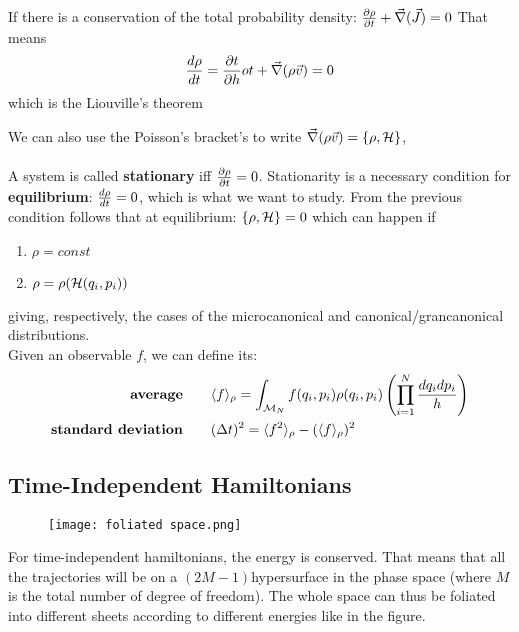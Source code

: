 If there is a conservation of the total probability density: $\frac{\partial\rho}{\partial t} + \vec\nabla(\vec J) = 0$
That means 
$$ \frac{d\rho}{dt} = \frac{\partial t}{\partial h}o t + \vec \nabla(\rho \vec v) = 0$$
which is the Liouville's theorem

We can also use the Poisson's bracket's to write $\vec\nabla(\rho \vec v) = \{\rho, \mathcal{H}\}$,\\ 
\\

\Def A system is called \textbf{stationary} iff $\frac{\partial\rho}{\partial t} = 0$. Stationarity is a necessary condition for \textbf{equilibrium}: $\frac{d\rho}{dt} = 0$, which is what we want to study. From the previous condition follows that at equilibrium: $\{\rho,\mathcal{H}\} = 0$ which can happen if
\begin{enumerate}
    \item $\rho = const$
    \item $\rho = \rho(\mathcal{H}(q_i,p_i))$
\end{enumerate}
giving, respectively, the cases of the microcanonical and canonical/grancanonical distributions.\\

\Def Given an observable $f$, we can define its: 
\begin{align*}  
\text{\textbf{average}} \qquad& \langle f\rangle_\rho = \int_{\mathcal{M}_N} f(q_i, p_i) \rho (q_i,p_i) \left(\prod_{i=1}^N \frac {dq_idp_i}h\right) \\
\text{\textbf{standard deviation}} \qquad & (\Delta t)^2 = \langle f^2 \rangle_\rho - (\langle f\rangle_\rho)^2
\end{align*}

\subsection{Time-Independent Hamiltonians}
\begin{wrapfigure}{r}{0.3\textwidth}
    \centering
    \texttt{[image: foliated space.png]}
\end{wrapfigure}
For time-independent hamiltonians, the energy is conserved. That means that all the trajectories will be on a $(2M-1)$hypersurface in the phase space (where $M$ is the total number of degree of freedom). The whole space can thus be foliated into different sheets according to different energies like in the figure.

